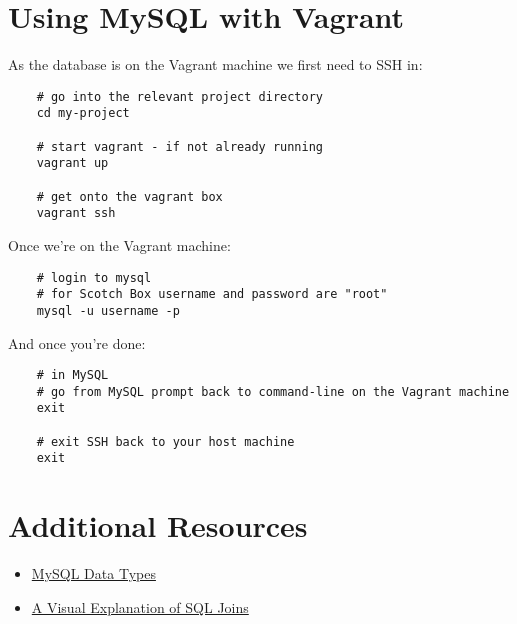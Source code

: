 \section{Using MySQL with Vagrant}

As the database is on the Vagrant machine we first need to SSH in:

\begin{verbatim}
    # go into the relevant project directory
    cd my-project

    # start vagrant - if not already running
    vagrant up

    # get onto the vagrant box
    vagrant ssh
\end{verbatim}

Once we're on the Vagrant machine:

\begin{verbatim}
    # login to mysql
    # for Scotch Box username and password are "root"
    mysql -u username -p
\end{verbatim}

And once you're done:

\begin{verbatim}
    # in MySQL
    # go from MySQL prompt back to command-line on the Vagrant machine
    exit

    # exit SSH back to your host machine
    exit
\end{verbatim}

\section{Additional Resources}

\begin{itemize}[leftmargin=*]
    \item \href{https://dev.mysql.com/doc/refman/5.7/en/data-types.html}{MySQL Data Types}
    \item \href{https://blog.codinghorror.com/a-visual-explanation-of-sql-joins/}{A Visual Explanation of SQL Joins}
\end{itemize}
